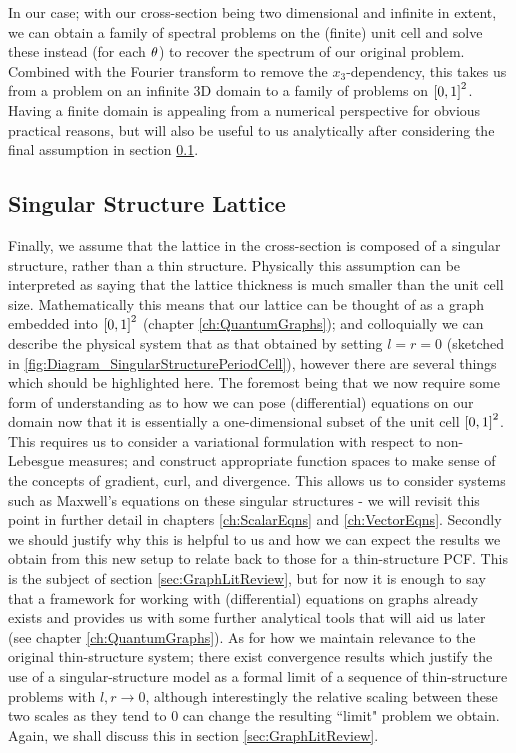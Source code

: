 In our case; with our cross-section being two dimensional and infinite in extent, we can obtain a family of spectral problems on the (finite) unit cell and solve these instead (for each $\theta$) to recover the spectrum of our original problem.
Combined with the Fourier transform to remove the $x_3$-dependency, this takes us from a problem on an infinite 3D domain to a family of problems on $\left[ 0,1 \right]^2$.
Having a finite domain is appealing from a numerical perspective for obvious practical reasons, but will also be useful to us analytically after considering the final assumption in section \ref{sec:ModellingAssumption3}.

\subsection{Singular Structure Lattice} \label{sec:ModellingAssumption3}
Finally, we assume that the lattice in the cross-section is composed of a singular structure, rather than a thin structure.
Physically this assumption can be interpreted as saying that the lattice thickness is much smaller than the unit cell size.
Mathematically this means that our lattice can be thought of as a graph embedded into $\left[ 0,1 \right]^2$ (chapter \ref{ch:QuantumGraphs}); and colloquially we can describe the physical system that as that obtained by setting $l=r=0$ (sketched in \ref{fig:Diagram_SingularStructurePeriodCell}), however there are several things which should be highlighted here.
The foremost being that we now require some form of understanding as to how we can pose (differential) equations on our domain now that it is essentially a one-dimensional subset of the unit cell $\left[ 0,1 \right]^2$.
This requires us to consider a variational formulation with respect to non-Lebesgue measures; and construct appropriate function spaces to make sense of the concepts of gradient, curl, and divergence.
This allows us to consider systems such as Maxwell's equations on these singular structures - we will revisit this point in further detail in chapters \ref{ch:ScalarEqns} and \ref{ch:VectorEqns}.
Secondly we should justify why this is helpful to us and how we can expect the results we obtain from this new setup to relate back to those for a thin-structure PCF.
This is the subject of section \ref{sec:GraphLitReview}, but for now it is enough to say that a framework for working with (differential) equations on graphs already exists and provides us with some further analytical tools that will aid us later (see chapter \ref{ch:QuantumGraphs}).
As for how we maintain relevance to the original thin-structure system; there exist convergence results which justify the use of a singular-structure model as a formal limit of a sequence of thin-structure problems with $l,r\rightarrow0$, although interestingly the relative scaling between these two scales as they tend to 0 can change the resulting ``limit" problem we obtain.
Again, we shall discuss this in section \ref{sec:GraphLitReview}.

